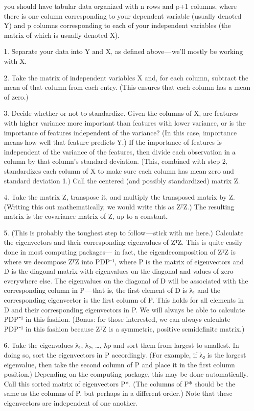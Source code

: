 \documentclass[
]{book}
\begin{document}
you should have tabular data organized with n rows and p+1 columns, where there is one column corresponding to your dependent variable (usually denoted Y) and p columns corresponding to each of your independent variables (the matrix of which is usually denoted X).

1. Separate your data into Y and X, as defined above --- we'll mostly be working with X.

2. Take the matrix of independent variables X and, for each column, subtract the mean of that column from each entry. (This ensures that each column has a mean of zero.)

3. Decide whether or not to standardize. Given the columns of X, are features with higher variance more important than features with lower variance, or is the importance of features independent of the variance? (In this case, importance means how well that feature predicts Y.) If the importance of features is independent of the variance of the features, then divide each observation in a column by that column's standard deviation. (This, combined with step 2, standardizes each column of X to make sure each column has mean zero and standard deviation 1.) Call the centered (and possibly standardized) matrix Z.

4. Take the matrix Z, transpose it, and multiply the transposed matrix by Z. (Writing this out mathematically, we would write this as ZᵀZ.) The resulting matrix is the covariance matrix of Z, up to a constant.

5. (This is probably the toughest step to follow --- stick with me here.) Calculate the eigenvectors and their corresponding eigenvalues of ZᵀZ. This is quite easily done in most computing packages--- in fact, the eigendecomposition of ZᵀZ is where we decompose ZᵀZ into PDP⁻¹, where P is the matrix of eigenvectors and D is the diagonal matrix with eigenvalues on the diagonal and values of zero everywhere else. The eigenvalues on the diagonal of D will be associated with the corresponding column in P --- that is, the first element of D is λ₁ and the corresponding eigenvector is the first column of P. This holds for all elements in D and their corresponding eigenvectors in P. We will always be able to calculate PDP⁻¹ in this fashion. (Bonus: for those interested, we can always calculate PDP⁻¹ in this fashion because ZᵀZ is a symmetric, positive semidefinite matrix.)

6. Take the eigenvalues λ₁, λ₂, \ldots, λp and sort them from largest to smallest. In doing so, sort the eigenvectors in P accordingly. (For example, if λ₂ is the largest eigenvalue, then take the second column of P and place it in the first column position.) Depending on the computing package, this may be done automatically. Call this sorted matrix of eigenvectors P*. (The columns of P* should be the same as the columns of P, but perhaps in a different order.) Note that these eigenvectors are independent of one another.
\end{document}
